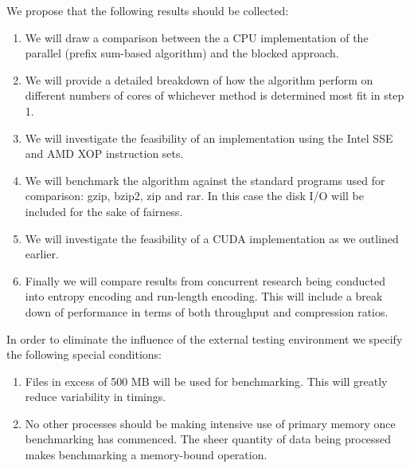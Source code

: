 \documentclass{acm_proc_article-sp}
\begin{document}
We propose that the following results should be collected:
\begin{enumerate}
 \item We will draw a comparison between the a CPU implementation of the parallel (prefix sum-based algorithm) and the blocked approach.
 \item We will provide a detailed breakdown of how the algorithm perform on different numbers of cores of whichever method is determined most fit in step 1.
 \item We will investigate the feasibility of an implementation using the Intel SSE and AMD XOP instruction sets.
 \item We will benchmark the algorithm against the standard programs used for comparison: gzip, bzip2, zip and rar. In this case the disk I/O will be included for the sake of fairness.
 \item We will investigate the feasibility of a CUDA implementation as we outlined earlier.
 \item Finally we will compare results from concurrent research being conducted into entropy encoding and run-length encoding. This will include a break down of performance in terms of both throughput and compression ratios.
\end{enumerate}

In order to eliminate the influence of the external testing environment we specify the following special conditions:
\begin{enumerate}
 \item Files in excess of 500 MB will be used for benchmarking. This will greatly reduce variability in timings.
 \item No other processes should be making intensive use of primary memory once benchmarking has commenced. The sheer quantity of data being processed makes benchmarking a memory-bound operation.
\end{enumerate}
\end{document}
